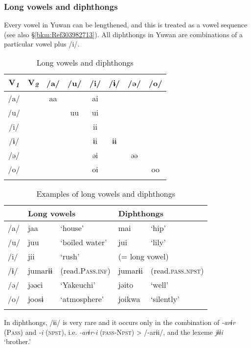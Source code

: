 \subsubsection{Long vowels and diphthongs}
\label{bkm:Ref367392475}\hypertarget{RefHeadingToc395696965}{}\label{bkm:Ref347178348}
Every vowel in Yuwan can be lengthened, and this is treated as a vowel sequence (see also §\ref{bkm:Ref303982713}). All diphthongs in Yuwan are combinations of a particular vowel plus /i/.

\begin{table}
\caption{Long vowels and diphthongs}
\begin{tabular}{ *{8}{c} }
\lsptoprule
 V\textit{\textsubscript{1}} & V\textit{\textsubscript{2}} & /a/ & /u/ &  /i/ & /ɨ/ & /ə/ & /o/\\
 \midrule
 /a/  &   & aa & & ai      \\
 /u/  &   & & uu & ui      \\
 /i/  &   & & & ii         \\
 /ɨ/  &   & & & ɨi & ɨɨ    \\
 /ə/  &   & & & əi & & əə  \\
 /o/  &   & & & oi & & & oo\\
\lspbottomrule
\end{tabular}
\end{table}


\begin{table}
\caption{Examples of long vowels and diphthongs}
\begin{tabular}{ *{5}{l} }
\lsptoprule
 & \multicolumn{2}{l}{Long vowels}  & \multicolumn{2}{l}{Diphthongs}\\
 \midrule
{/a/} & {jaa} & {‘house’}  & {mai}  & {‘hip’}\\
{/u/} & {juu} & {‘boiled water’} & {jui} & {‘lily’}\\
{/i/} & {jii} & {‘rush’} & \multicolumn{2}{l}{(= long vowel)}\\
{/ɨ/} & {jumarɨɨ}  & {(read.P\textsc{ass}.\textsc{inf})} & jumarɨi & {(read.\textsc{pass}.\textsc{npst})}\\
{/ə/} & {jəəci} & {‘Yakeuchi’} & {jəito} &   {‘well’}\\
{/o/} & {joosɨ} & {‘atmosphere’}  & {joikwa} &  {‘silently’}\\
\lspbottomrule
\end{tabular}
\end{table}


In diphthongs, /ɨi/ is very rare and it occurs only in the combination of \textit{-arɨr} (P\textsc{ass}) and \textit{-i} (\textsc{npst}), i.e. \textit{-arɨr-i} (\textsc{pass}-N\textsc{pst}) > /-arɨi/, and the lexeme \textit{jɨɨi} ‘brother.’

